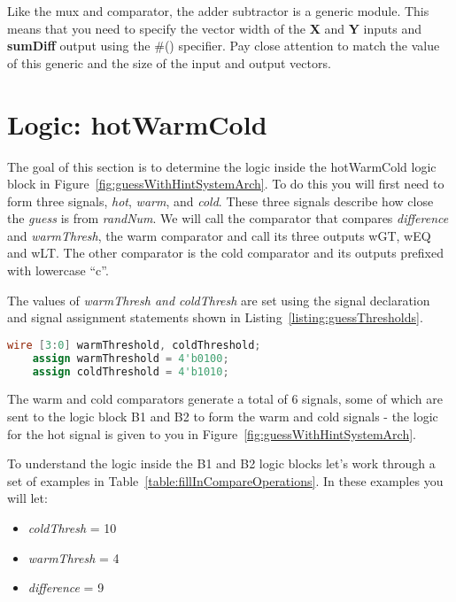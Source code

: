 Like the mux and comparator, the adder subtractor is a generic module.
This means that you need to specify the vector width of the \textbf{X}
and \textbf{Y} inputs and \textbf{sumDiff} output using the \#()
specifier. Pay close attention to match the value of this generic and
the size of the input and output vectors.

\section{Logic: hotWarmCold}

The goal of this section is to determine the logic inside the hotWarmCold logic block
in Figure~\ref{fig:guessWithHintSystemArch}.  To do this you will first need to form three
signals, \emph{hot}, \emph{warm}, and \emph{cold}.  These three signals describe how close the
\emph{guess} is from \emph{randNum}. We will call the comparator that compares \emph{difference}
and \emph{warmThresh}, the warm comparator and call its three outputs wGT, wEQ and wLT.
The other comparator is the cold comparator and its outputs prefixed with  lowercase ``c''.

The values of \emph{warmThresh and coldThresh} are set using the signal declaration
and signal assignment statements shown in Listing~\ref{listing:guessThresholds}.

\begin{lstlisting}[language=Verilog,
 caption={The signal declaration and assignment for guess thresholds.},
 label={listing:guessThresholds},
 frame=single]
    wire [3:0] warmThreshold, coldThreshold;
    assign warmThreshold = 4'b0100;
    assign coldThreshold = 4'b1010;
\end{lstlisting}

The warm and cold comparators generate a total of 6 signals, some of which are
sent to the logic block B1 and B2 to form the warm and cold signals - the logic for the
hot signal is given to you in Figure~\ref{fig:guessWithHintSystemArch}.

To understand the logic inside the B1 and B2 logic blocks let's work through a
set of examples in Table~\ref{table:fillInCompareOperations}.  In these examples
you will let:
\begin{itemize}
    \item \emph{coldThresh} = 10
    \item \emph{warmThresh} = 4
    \item \emph{difference} = 9
\end{itemize}

